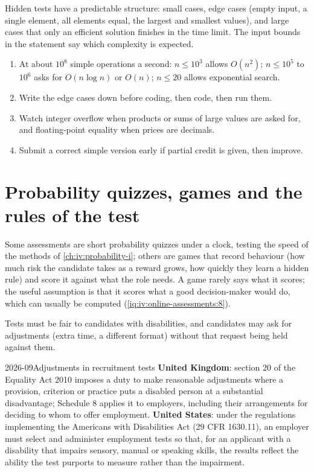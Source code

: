Hidden tests have a predictable structure: small cases, edge cases (empty input, a single element, all
elements equal, the largest and smallest values), and large cases that only an efficient solution finishes in
the time limit. The input bounds in the statement say which complexity is expected.

\begin{method}\label{met:iv:online-assessments:bounds}
\begin{enumerate}
\item At about $10^8$ simple operations a second: $n \le 10^3$ allows $O(n^2)$; $n \le 10^5$ to $10^6$ asks for
$O(n \log n)$ or $O(n)$; $n \le 20$ allows exponential search.
\item Write the edge cases down before coding, then code, then run them.
\item Watch integer overflow when products or sums of large values are asked for, and floating-point
equality when prices are decimals.
\item Submit a correct simple version early if partial credit is given, then improve.
\end{enumerate}
\end{method}

\section{Probability quizzes, games and the rules of the test}

Some assessments are short probability quizzes under a clock, testing the speed of the methods of
\cref{ch:iv:probability-i}; others are games that record behaviour (how much risk the candidate takes as a
reward grows, how quickly they learn a hidden rule) and score it against what the role needs. A game rarely
says what it scores; the useful assumption is that it scores what a good decision-maker would do, which can
usually be computed (\cref{iq:iv:online-assessments:8}).

Tests must be fair to candidates with disabilities, and candidates may ask for adjustments (extra time, a
different format) without that request being held against them.

\begin{dated}{2026-09}{Adjustments in recruitment tests}\label{dat:iv:online-assessments:adjust}
\textbf{United Kingdom}: section 20 of the Equality Act 2010 imposes a duty to make reasonable adjustments
where a provision, criterion or practice puts a disabled person at a substantial disadvantage; Schedule 8
applies it to employers, including their arrangements for deciding to whom to offer employment.
\textbf{United States}: under the regulations implementing the Americans with Disabilities Act (29 CFR
1630.11), an employer must select and administer employment tests so that, for an applicant with a disability
that impairs sensory, manual or speaking skills, the results reflect the ability the test purports to
measure rather than the impairment.
\end{dated}

